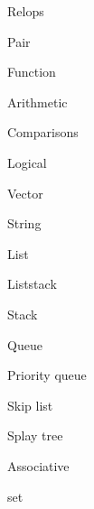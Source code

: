 \categorycontents{}
\newpage

\begin{algorithm}{Relops}
\end{algorithm}
\begin{algorithm}{Pair}
\end{algorithm}
\begin{algorithm}{Function}
\end{algorithm}
\begin{algorithm}{Arithmetic}
\end{algorithm}
\begin{algorithm}{Comparisons}
\end{algorithm}
\begin{algorithm}{Logical}
\end{algorithm}
\begin{algorithm}{Vector}
\end{algorithm}
\begin{algorithm}{String}
\end{algorithm}
\begin{algorithm}{List}
\end{algorithm}
\begin{algorithm}{Liststack}
\end{algorithm}
\begin{algorithm}{Stack}
\end{algorithm}
\begin{algorithm}{Queue}
\end{algorithm}
\begin{algorithm}{Priority queue}
\end{algorithm}
\begin{algorithm}{Skip list}
\end{algorithm}
\begin{algorithm}{Splay tree}
\end{algorithm}
\begin{algorithm}{Associative}
\end{algorithm}
\begin{algorithm}{set}
\end{algorithm}
